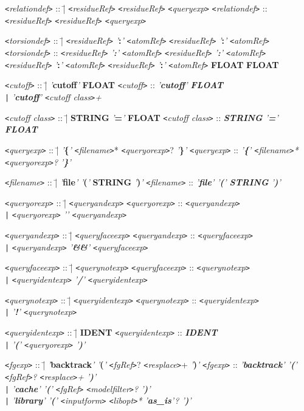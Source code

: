 \documentclass[11pt]{article}
\newcommand{\keyword}[1]{{\rm {\tt <}{\em #1}{\tt >}}}
\newcommand{\nonterminal}[1]{{\rm {\tt <}{\em #1}{\tt >}}}
\newcommand{\terminal}[1]{{\em '}{\bf #1}{\em '}}
\newcommand{\token}[1]{{\bf #1}}
\newenvironment{grammarrule}[2]{\begin{tabbing}
    \keyword{#1} :: \= | \= #2 \kill
    \keyword{#1} :: \> \> {\em #2} \\}
  {\end{tabbing}}
\newenvironment{biggrammarrule}[3]{\begin{tabbing}
    \keyword{#1} :: \= | \= #2 \kill
    \keyword{#1} :: \> \> {\em #2} \\
    \> \> #3 \\}
  {\end{tabbing}}
\newcommand{\altrule}[1]{\> {\tt |} \> {\em #1} \\}
\begin{document}
\begin{grammarrule}{relationdef}
  {\nonterminal{residueRef} \nonterminal{residueRef} \nonterminal{queryexp}}
\end{grammarrule}
\begin{biggrammarrule}{torsiondef}
  {\nonterminal{residueRef} \terminal{:} \nonterminal{atomRef}
    \nonterminal{residueRef} \terminal{:} \nonterminal{atomRef}}
  {\nonterminal{residueRef} \terminal{:} \nonterminal{atomRef}
    \nonterminal{residueRef} \terminal{:} \nonterminal{atomRef}
    \token{FLOAT} \token{FLOAT}}
\end{biggrammarrule}
\begin{grammarrule}{cutoff}{\terminal{cutoff} \token{FLOAT}}
  \altrule{\terminal{cutoff} \nonterminal{cutoff class}+}
\end{grammarrule}
\begin{grammarrule}{cutoff class}{\token{STRING} \terminal{=}
    \token{FLOAT}}
\end{grammarrule}
\begin{grammarrule}{queryexp}{\terminal{\{} \nonterminal{filename}*
    \nonterminal{queryorexp}? \terminal{\}}}
\end{grammarrule}
\begin{grammarrule}{filename}{\terminal{file} \terminal{(} \token{STRING}
    \terminal{)}}
\end{grammarrule}
\begin{grammarrule}{queryorexp}{\nonterminal{queryandexp}}
  \altrule{\nonterminal{queryorexp} \terminal{\boldmath{$||$}}
    \nonterminal{queryandexp}}
\end{grammarrule}
\begin{grammarrule}{queryandexp}{\nonterminal{queryfaceexp}}
  \altrule{\nonterminal{queryandexp} \terminal{\&\&}
    \nonterminal{queryfaceexp}}
\end{grammarrule}
\begin{grammarrule}{queryfaceexp}{\nonterminal{querynotexp}}
  \altrule{\nonterminal{queryidentexp} \terminal{/}
    \nonterminal{queryidentexp}}
\end{grammarrule}
\begin{grammarrule}{querynotexp}{\nonterminal{queryidentexp}}
  \altrule{\terminal{!} \nonterminal{querynotexp}}
\end{grammarrule}
\begin{grammarrule}{queryidentexp}{\token{IDENT}}
  \altrule{\terminal{(} \nonterminal{queryorexp} \terminal{)}}
\end{grammarrule}
\begin{grammarrule}{fgexp}{\terminal{backtrack} \terminal{(} \nonterminal{fgRef}?
    \nonterminal{resplace}+ \terminal{)}}
  \altrule{\terminal{cache} \terminal{(} \nonterminal{fgRef}
    \nonterminal{modelfilter}? \terminal{)}}
  \altrule{\terminal{library} \terminal{(} \nonterminal{inputform}
    \nonterminal{libopt}* \terminal{as\_is}? \terminal{)}}
\end{grammarrule}
\end{document}
